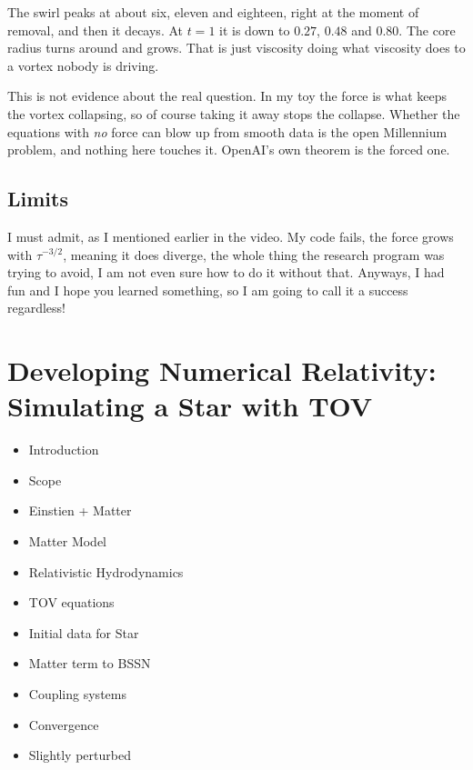 The swirl peaks at about six, eleven and eighteen, right at the moment of removal, and then it decays. At $t=1$ it is down to $0.27$, $0.48$ and $0.80$. The core radius turns around and grows. That is just viscosity doing what viscosity does to a vortex nobody is driving.

This is not evidence about the real question. In my toy the force is what keeps the vortex collapsing, so of course taking it away stops the collapse. Whether the equations with \emph{no} force can blow up from smooth data is the open Millennium problem, and nothing here touches it. OpenAI's own theorem is the forced one.
\subsection{Limits}
I must admit, as I mentioned earlier in the video. My code fails, the force grows with $\tau^{-3/2}$, meaning it does diverge, the whole thing the research program was trying to avoid, I am not even sure how to do it without that. Anyways, I had fun and I hope you learned something, so I am going to call it a success regardless!


\section{Developing Numerical Relativity: Simulating a Star with TOV}

\begin{itemize}
	\item Introduction
	\item Scope
	\item Einstien + Matter
	\item Matter Model
	\item Relativistic Hydrodynamics
	\item TOV equations
	\item Initial data for Star
	\item Matter term to BSSN
	\item Coupling systems
	\item Convergence
	\item Slightly perturbed
\end{itemize}

